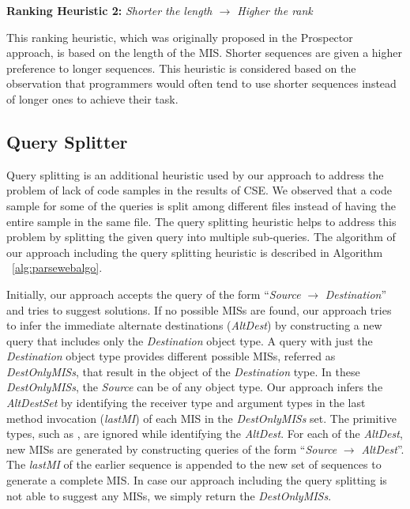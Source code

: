 \documentclass{fp035-thummalapenta}
\begin{document}
\textbf{Ranking Heuristic 2:} \emph{Shorter the length $\rightarrow$
Higher the rank}

This ranking heuristic, which was originally proposed in the
Prospector~\cite{prospector:jungloid} approach, is based on the
length of the MIS. Shorter sequences are given a higher preference to
longer sequences. This heuristic is considered based on the
observation that programmers would often tend to use shorter
sequences instead of longer ones to achieve their task.

\subsection{Query Splitter}
\label{sec:querysplitter}
Query splitting is an additional heuristic used by our approach to
address the problem of lack of code samples in the results of CSE.
We observed that a code sample for some of the queries is split
among different files instead of having the entire sample in the
same file. The query splitting heuristic helps to address this
problem by splitting the given query into multiple sub-queries. The
algorithm of our approach including the query splitting heuristic is
described in Algorithm ~\ref{alg:parsewebalgo}.

Initially, our approach accepts the query of the form
``\emph{Source} $\rightarrow$ \emph{Destination}'' and tries to
suggest solutions. If no possible MISs are found, our approach tries
to infer the immediate alternate destinations (\emph{AltDest}) by
constructing a new query that includes only the \emph{Destination}
object type. A query with just the \emph{Destination} object
type provides different possible MISs, referred as
\emph{DestOnlyMISs}, that result in the object of the
\emph{Destination} type. In these \emph{DestOnlyMISs}, the
\emph{Source} can be of any object type. Our approach infers the
\emph{AltDestSet} by identifying the receiver type and argument
types in the last method invocation (\emph{lastMI}) of each MIS in
the \emph{DestOnlyMISs} set. The primitive types, such as
, are ignored while identifying the \emph{AltDest}. For
each of the \emph{AltDest}, new MISs are generated by constructing
queries of the form ``\emph{Source} $\rightarrow$ \emph{AltDest}''.
The \emph{lastMI} of the earlier sequence is appended to the new set
of sequences to generate a complete MIS. In case our approach
including the query splitting is not able to suggest any MISs, we
simply return the \emph{DestOnlyMISs}.
\end{document}
